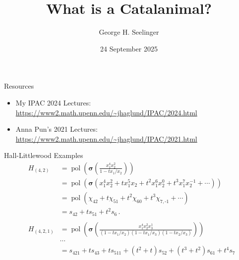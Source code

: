 \documentclass[dvipsnames]{beamer}
\title[]{What is a Catalanimal?} %
\author[George H. Seelinger]{George H. Seelinger} %
\institute[UMich] %
{
ghseeli@umich.edu\\ %
\medskip
ICERM: What is...? Seminar \\ %
\medskip
}
\date{24 September 2025} %
\newcommand{\sigmabold}{\boldsymbol \sigma}
\DeclareMathOperator{\pol}{pol}
\theoremstyle{definition}
\newcounter{c}
\begin{document}
\begin{frame}
\titlepage %
\end{frame}
\begin{frame}{Resources}
  \begin{itemize}
  \item My IPAC 2024 Lectures:
    \url{https://www2.math.upenn.edu/~jhaglund/IPAC/2024.html}
  \item Anna Pun’s 2021 Lectures: \url{https://www2.math.upenn.edu/~jhaglund/IPAC/2021.html}
  \end{itemize}
\end{frame}
\begin{frame}{Hall-Littlewood Examples}
  \begin{eqnarray*}
    & H_{(4,2)} & = \pol\left( \sigmabold\left( \frac{x_1^4 x_2^2}{1-t
                x_1/x_2} \right) \right)\\
    &&= \pol\left( \sigmabold \left( x_1^4 x_2^2 + t x_1^5 x_2 + t^2
      x_1^6 x_2^0 + t^3 x_1^7 x_2^{-1} + \cdots \right) \right) \\
    &&= \pol\left( \chi_{42} + t \chi_{51} + t^2 \chi_{60} + t^3
      \chi_{7,{\text{-}1}} + \cdots\right) \\
    &&= s_{42} + t s_{51} + t^2 s_{6} \,. \\
    && \\
    & H_{(4,2,1)} & = \pol\left( \sigmabold\left( \frac{x_1^4 x_2^2
                    x_3^1}{(1-t x_1/x_2)(1-t x_1/x_3)(1-t x_2/x_3)}
                    \right) \right) \\
    && \cdots \\
    && = s_{421} + ts_{43}+ts_{511}+(t^2+t)s_{52}+(t^3+t^2)s_{61}+t^4 s_7
  \end{eqnarray*}
\end{frame}
\end{document}
